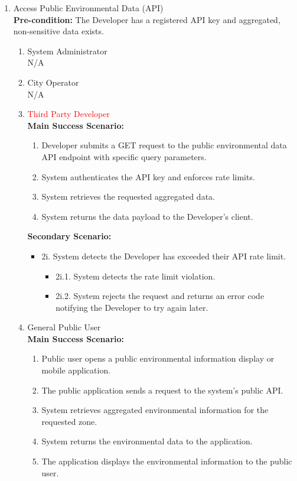{\begin{enumerate}[{\bf BE1.}]
	\item Access Public Environmental Data (API) \\
    {\bf Pre-condition:} The Developer has a registered API key and aggregated, non-sensitive data exists.
    \begin{enumerate}[{\bf VP1.}]
        \item System Administrator \\ N/A
        \item City Operator \\ N/A
        \item \textcolor{red}{Third Party Developer} \\
            {\bf Main Success Scenario:}
                \begin{enumerate}[1. ]
                    \item Developer submits a GET request to the public environmental data API endpoint with specific query parameters.
                    \item System authenticates the API key and enforces rate limits.
                    \item System retrieves the requested aggregated data.
                    \item System returns the data payload to the Developer's client.
                \end{enumerate}

            {\bf Secondary Scenario:}
            \begin{itemize}
                \item[] {2i.} System detects the Developer has exceeded their API rate limit.
                \begin{itemize}
                    \item[] {2i.1.} System detects the rate limit violation.
                    \item[] {2i.2.} System rejects the request and returns an error code notifying the Developer to try again later.
                \end{itemize}
            \end{itemize}
        \item General Public User \\
        {\bf Main Success Scenario:}
            \begin{enumerate}[1. ]
                \item Public user opens a public environmental information display or mobile application.
                \item The public application sends a request to the system’s public API.
                \item System retrieves aggregated environmental information for the requested zone.
                \item System returns the environmental data to the application.
                \item The application displays the environmental information to the public user.
            \end{enumerate}


\end{enumerate}
\end{enumerate}}

